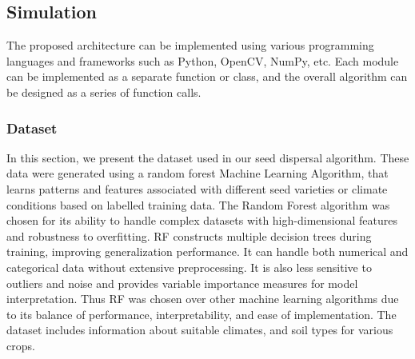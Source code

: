 \documentclass[conference]{IEEEtran}
\begin{document}
\subsection{Simulation}
The proposed architecture can be implemented using various programming languages and frameworks such as Python, OpenCV, NumPy, etc. Each module can be implemented as a separate function or class, and the overall algorithm can be designed as a series of function calls.


\subsubsection*{Dataset}
In this section, we present the dataset used in our seed dispersal algorithm. These data were generated using a random forest Machine Learning Algorithm, that learns patterns and features associated with different seed varieties or climate conditions based on labelled training data. 
The Random Forest algorithm was chosen for its ability to handle complex datasets with high-dimensional features and robustness to overfitting. RF constructs multiple decision trees during training, improving generalization performance. It can handle both numerical and categorical data without extensive preprocessing. It is also less sensitive to outliers and noise and provides variable importance measures for model interpretation. Thus RF was chosen over other machine learning algorithms due to its balance of performance, interpretability, and ease of implementation. The dataset includes information about suitable climates, and soil types for various crops.
\end{document}
